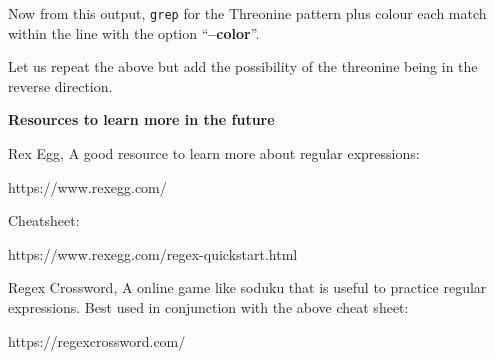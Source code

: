 \documentclass[
  letterpaper,
  DIV=11,
  numbers=noendperiod]{scrreprt}
\newenvironment{Shaded}{\begin{snugshade}}{\end{snugshade}}
\newcommand{\AttributeTok}[1]{\textcolor[rgb]{0.40,0.45,0.13}{#1}}
\newcommand{\DataTypeTok}[1]{\textcolor[rgb]{0.68,0.00,0.00}{#1}}
\newcommand{\FunctionTok}[1]{\textcolor[rgb]{0.28,0.35,0.67}{#1}}
\newcommand{\KeywordTok}[1]{\textcolor[rgb]{0.00,0.23,0.31}{\textbf{#1}}}
\newcommand{\NormalTok}[1]{\textcolor[rgb]{0.00,0.23,0.31}{#1}}
\newcommand{\StringTok}[1]{\textcolor[rgb]{0.13,0.47,0.30}{#1}}
\begin{document}
\begin{Shaded}
\end{Shaded}

Now from this output, \texttt{grep} for the Threonine pattern plus
colour each match within the line with the option ``\textbf{--color}''.

\begin{Shaded}
\end{Shaded}

Let us repeat the above but add the possibility of the threonine being
in the reverse direction.

\begin{Shaded}
\end{Shaded}

\textbf{Resources to learn more in the future}

Rex Egg, A good resource to learn more about regular expressions:

https://www.rexegg.com/

Cheatsheet:

https://www.rexegg.com/regex-quickstart.html

Regex Crossword, A online game like soduku that is useful to practice
regular expressions. Best used in conjunction with the above cheat
sheet:

https://regexcrossword.com/
\end{document}
